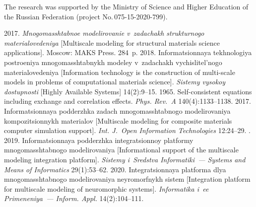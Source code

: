 \Ack

\vspace*{-3pt}

\noindent
The research was supported by the Ministry of Science and Higher Education of the Russian 
Federation (project No.\,075-15-2020-799).




  \begin{multicols}{2}

\renewcommand{\bibname}{\protect\rmfamily References}

{\small\frenchspacing
 {%
 \begin{thebibliography}{9}
    2017. \textit{Mnogomasshtabnoe modelirovanie v~zadachakh strukturnogo 
materialovedeniya} [Multiscale modeling for structural materials science applications]. Moscow: MAKS 
Press. 284~p.
    2018. Informatsionnaya tekhnologiya postroeniya mnogomasshtabnykh 
modeley v~zadachakh vychislitel'nogo materialovedeniya [Information technology is the construction of 
multi-scale models in problems of computational materials science]. \textit{Sistemy vysokoy dostupnosti} 
[Highly Available Systems] 14(2):9--15.
    1965. Self-consistent equations including exchange and correlation 
effects. \textit{Phys. Rev.~A} 140(4):1133--1138.
    2017. Informatsionnaya podderzhka 
zadach mnogomasshtabnogo modelirovaniya kompozitsionnykh materialov [Multiscale modeling for 
composite materials computer simulation support]. \textit{Int. J.~Open Information Technologies} 
12:24--29.
   . 2019. In\-for\-ma\-tsi\-on\-naya podderzhka integratsionnoy 
platformy mno\-go\-massh\-tab\-no\-go modelirovaniya [Informational support of the multiscale modeling 
integration platform]. \textit{Sistemy i~Sredstva Informatiki~--- Systems and Means of Informatics} 
29(1):53--62.
     2020. Integratsionnaya platforma dlya 
mnogomasshtabnogo modelirovaniya neyromorfnykh sistem [Integration platform for multiscale 
modeling of neuromorphic systems]. \textit{Informatika i~ee Primeneniya~--- Inform. Appl.} 
14(2):104--111.
\end{thebibliography}

 }
 }

\end{multicols}

